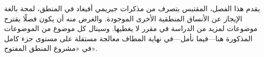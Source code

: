 \documentclass[../../../include/open-logic-chapter]{subfiles}
\begin{document}

\begin{editorial}
  يقدم هذا الفصل، المقتبس بتصرف من مذكرات جيريمي أفيغاد في المنطق،
  لمحة بالغة الإيجاز عن الأنساق المنطقية الأخرى الموجودة. والغرض منه
  أن يكون فصلًا يقترح موضوعات لمزيد من الدراسة في مقرر لا يغطيها.
  وسينال كل موضوع من الموضوعات المذكورة هنا---فيما نأمل---في نهاية
  المطاف معالجة مستقلة على مستوى جزء كامل في «مشروع المنطق المفتوح».
\end{editorial}








\OLEndChapterHook
\end{document}

